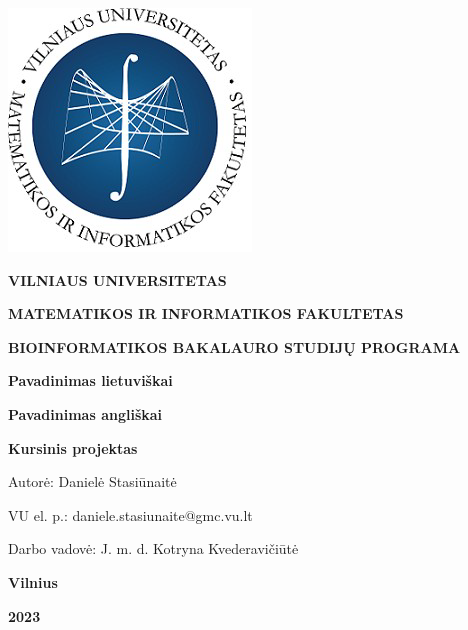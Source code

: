 \documentclass[12pt]{article}
\begin{document}

\begin{titlepage}
\vskip 20pt
\begin{center}
\includegraphics[scale=0.5]{MIF}
\end{center}


\vskip 20pt
\centerline{\bf \large \textbf{VILNIAUS UNIVERSITETAS}}
\bigskip
\centerline{\large \textbf{MATEMATIKOS IR INFORMATIKOS FAKULTETAS}}
\bigskip
\centerline{\large \textbf{BIOINFORMATIKOS BAKALAURO STUDIJŲ PROGRAMA}}

\vskip 90pt
\begin{center}
    {\bf \LARGE Pavadinimas lietuviškai}
\end{center}
\begin{center}
    {\bf \Large Pavadinimas angliškai}
\end{center}
\vskip 20pt
\centerline{\bf \large \textbf{Kursinis projektas}}
\bigskip
\vskip 40pt

\hskip 140pt {\large Autorė: Danielė Stasiūnaitė}

\hskip 140pt{\large VU el. p.: daniele.stasiunaite@gmc.vu.lt}
\bigskip
\vskip 20pt

\hskip 140pt {\large Darbo vadovė: J. m. d. Kotryna Kvederavičiūtė}
\vskip 60pt
\vskip 40pt
\centerline{\large \textbf{Vilnius}}
\centerline{\large \textbf{2023}}
\newpage
\end{titlepage}



\tableofcontents
\newpage

\end{document}

